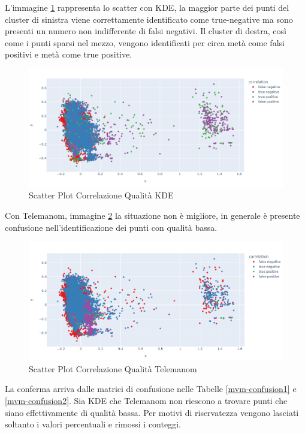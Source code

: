L'immagine \ref{kde_quality} rappresenta lo scatter con KDE, la maggior parte dei punti del cluster di sinistra viene correttamente identificato come true-negative ma sono presenti un numero non indifferente di falsi negativi. Il cluster di destra, così come i punti sparsi nel mezzo, vengono identificati per circa metà come falsi positivi e metà come true positive.
\begin{figure}[t]
	\centering
	\includegraphics[width=14cm, scale=1]{images/correlation_ssb1_quality_plot.png}
	\caption{Scatter Plot Correlazione Qualità KDE}
	\label{kde_quality}
\end{figure}

Con Telemanom, immagine \ref{worst_clf_quality} la situazione non è migliore, in generale è presente confusione nell'identificazione dei punti con qualità bassa.


\begin{figure}[t]
	\centering
	\includegraphics[width=14cm, scale=1]{images/worst_correlation_ssb1_quality_plot}
	\caption{Scatter Plot Correlazione Qualità Telemanom}
	\label{worst_clf_quality}
\end{figure}

La conferma arriva dalle matrici di confusione nelle Tabelle \ref{mvm-confusion1} e \ref{mvm-confusion2}. Sia KDE che Telemanom non riescono a trovare punti che siano effettivamente di qualità bassa. Per motivi di riservatezza vengono lasciati soltanto i valori percentuali e rimossi i conteggi.



